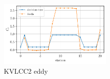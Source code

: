     \begin{figure}[H]
        \begin{center}\includegraphics[width = 0.5\textwidth]{figures/kvlcc2_eddy.pdf}\end{center}
        \vspace{-1cm}
        \caption{KVLCC2 eddy}
        \label{fig:kvlcc2_eddy}
    \end{figure}